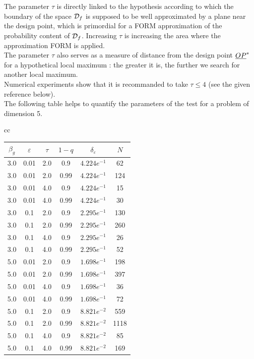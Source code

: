 {
  The parameter $\tau$ is directly linked to the hypothesis according to which the boundary of the space ${\mathcal D}_f$ is supposed to be well approximated by a plane near the design point, which is primordial for a FORM approximation of the probability content of ${\mathcal D}_f$. Increasing $\tau$ is increasing the  area where the approximation FORM is applied. \\
  The parameter $\tau$ also serves as a measure of distance from the design point ${\underline{OP}}^*$ for a hypothetical local maximum : the greater it is, the further we search for another local maximum.\\
  Numerical experiments show that it is recommanded to take $\tau \leq 4$ (see the given reference below).\\

  The following table  helps to quantify the parameters of the test for a problem of dimension 5.

  \begin{center}

    \begin{tabular}{cc}

      \begin{tabular}{|c|c|c|c|c|c|}
        \hline
        $\beta_g$ & $\varepsilon$  & $\tau$  & $1-q$  & $\delta_{\varepsilon}$  & $N$ \\
        \hline
        3.0  & 0.01  & 2.0 &  0.9   & $4.224 e^{-1}$  &62\\
        \hline
        3.0   &0.01  & 2.0  & 0.99  & $4.224 e^{-1}$ & 124\\
        \hline
        3.0   &0.01  & 4.0  & 0.9   &$4.224 e^{-1}$ &15\\
        \hline
        3.0   &0.01  & 4.0  & 0.99  & $4.224 e^{-1}$ & 30\\
        \hline
        3.0   &0.1   &2.0  & 0.9   &$2.295 e^{-1}$ & 130\\
        \hline
        3.0   &0.1  & 2.0  & 0.99 &  $2.295 e^{-1}$ & 260\\
        \hline
        3.0   &0.1  & 4.0  & 0.9  & $2.295 e^{-1}$ & 26\\
        \hline
        3.0   &0.1   &4.0  & 0.99  & $2.295  e^{-1}$& 52\\
        \hline
        5.0   &0.01  & 2.0  & 0.9 &  $1.698 e^{-1}$  &198\\
        \hline
        5.0   &0.01  & 2.0 &  0.99  & $1.698 e^{-1}$ & 397\\
        \hline
        5.0   &0.01  &4.0 &  0.9   & $1.698 e^{-1}$ & 36\\
        \hline
        5.0   &0.01   &4.0  & 0.99  & $1.698 e^{-1}$ & 72\\
        \hline
        5.0   &0.1  & 2.0  & 0.9  & $8.821  e^{-2}$& 559\\
        \hline
        5.0   &0.1  & 2.0  & 0.99   & $8.821 e^{-2}$  &1118\\
        \hline
        5.0   &0.1  & 4.0  & 0.9   & $8.821  e^{-2}$ &85\\
        \hline
        5.0   &0.1  & 4.0 &  0.99   & $8.821 e^{-2}$   &169\\
        \hline
      \end{tabular}


\end{tabular}
\end{center}}
